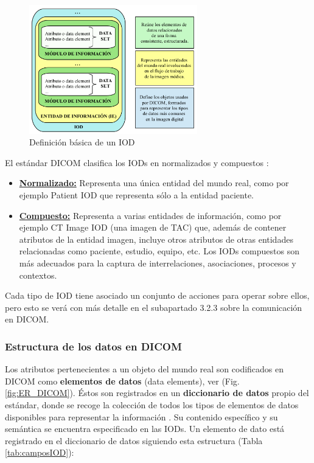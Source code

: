 \begin{figure}[!h]
\begin{center}
\includegraphics[width=0.65\textwidth]{images/def_bas_IOD.png}
\caption{Definición básica de un \acs{IOD}}
\label{fig:def_IOD}
\end{center}
\end{figure}

El estándar DICOM clasifica los IODs en normalizados y compuestos \cite{11} \cite{13}:

\begin{itemize}
\item \textbf{\underline{Normalizado:}} Representa una única entidad del mundo real, como por ejemplo Patient IOD que representa sólo a la entidad paciente.
\item \textbf{\underline{Compuesto:}} Representa a varias entidades de información, como por ejemplo CT Image IOD (una imagen de TAC) que, además de contener atributos de la entidad imagen, incluye otros atributos de otras entidades relacionadas como paciente, estudio, equipo, etc. Los IODs compuestos son más adecuados para la captura de interrelaciones, asociaciones, procesos y contextos.
\end{itemize}

Cada tipo de IOD tiene asociado un conjunto de acciones para operar sobre ellos, pero esto se verá con más detalle en el subapartado 3.2.3 sobre la comunicación en DICOM.

\subsubsection{Estructura de los datos en \acs{DICOM}}
Los atributos pertenecientes a un objeto del mundo real son codificados en \acs{DICOM} como \textbf{elementos de datos} (data elements), ver (Fig. \ref{fig:ER_DICOM}). Éstos son registrados en un \textbf{diccionario de datos} propio del estándar, donde se recoge la colección de todos los tipos de elementos de datos disponibles para representar la información \cite{14}. Su contenido específico y su semántica se encuentra especificado en las IODs. Un elemento de dato está registrado en el diccionario de datos siguiendo esta estructura (Tabla \ref{tab:camposIOD}):

